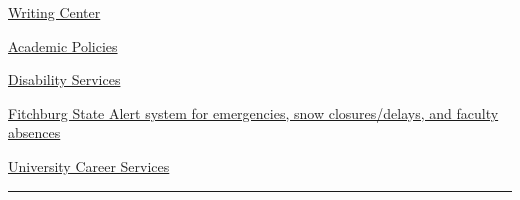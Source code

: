 \documentclass[
  letterpaper,
  DIV=11,
  numbers=noendperiod]{scrartcl}
\begin{document}
\href{http://www.fitchburgstate.edu/offices-services-directory/tutor-center/writing-help/}{Writing
Center}

\href{http://catalog.fitchburgstate.edu/content.php?catoid=13\&navoid=851}{Academic
Policies}

\href{http://www.fitchburgstate.edu/offices-services-directory/disability-services/}{Disability
Services}

\href{https://www.getrave.com/login/fitchburgstate/}{Fitchburg State
Alert system for emergencies, snow closures/delays, and faculty
absences}

\href{http://www.fitchburgstate.edu/offices-services-directory/career-counseling-and-advising/careerservices/}{University
Career Services}

\begin{center}\rule{0.5\linewidth}{0.5pt}\end{center}
\end{document}
